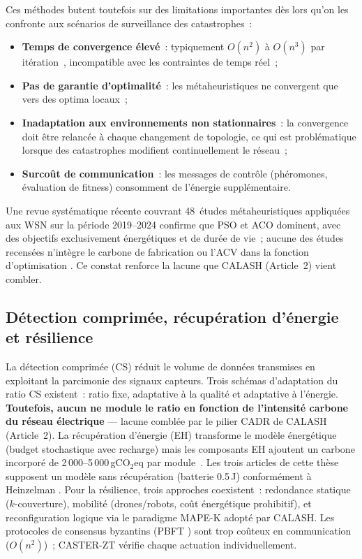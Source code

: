 Ces méthodes butent toutefois sur des limitations importantes dès lors qu'on les confronte aux scénarios de surveillance des catastrophes~:
\begin{itemize}
    \item \textbf{Temps de convergence élevé}~: typiquement $O(n^2)$ à $O(n^3)$ par itération~\cite{dorigo2004ant,kennedy1995pso}, incompatible avec les contraintes de temps réel~;
    \item \textbf{Pas de garantie d'optimalité}~: les métaheuristiques ne convergent que vers des optima locaux~;
    \item \textbf{Inadaptation aux environnements non stationnaires}~: la convergence doit être relancée à chaque changement de topologie, ce qui est problématique lorsque des catastrophes modifient continuellement le réseau~;
    \item \textbf{Surcoût de communication}~: les messages de contrôle (phéromones, évaluation de fitness) consomment de l'énergie supplémentaire.
\end{itemize}
Une revue systématique récente couvrant 48~études métaheuristiques appliquées aux WSN sur la période 2019--2024 confirme que PSO et ACO dominent, avec des objectifs exclusivement énergétiques et de durée de vie~; aucune des études recensées n'intègre le carbone de fabrication ou l'ACV dans la fonction d'optimisation \cite{metaheuristic_wsn_slr2026}. Ce constat renforce la lacune que CALASH (Article~2) vient combler.
\subsection{Détection comprimée, récupération d'énergie et résilience}

La détection comprimée (CS) \cite{candes2006cs} réduit le volume de données transmises en exploitant la parcimonie des signaux capteurs. Trois schémas d'adaptation du ratio CS existent~: ratio fixe, adaptative à la qualité et adaptative à l'énergie. \textbf{Toutefois, aucun ne module le ratio en fonction de l'intensité carbone du réseau électrique} --- lacune comblée par le pilier CADR de CALASH (Article~2). La récupération d'énergie (EH) transforme le modèle énergétique (budget stochastique avec recharge) mais les composants EH ajoutent un carbone incorporé de 2\,000--5\,000\,gCO$_2$eq par module~\cite{pirson2021embodied}. Les trois articles de cette thèse supposent un modèle sans récupération (batterie 0.5\,J) conformément à Heinzelman \cite{heinzelman2000leach}. Pour la résilience, trois approches coexistent~: redondance statique ($k$-couverture), mobilité (drones/robots, coût énergétique prohibitif), et reconfiguration logique via le paradigme MAPE-K adopté par CALASH. Les protocoles de consensus byzantins (PBFT \cite{castro1999pbft}) sont trop coûteux en communication ($O(n^2)$)~; CASTER-ZT vérifie chaque actuation individuellement.

